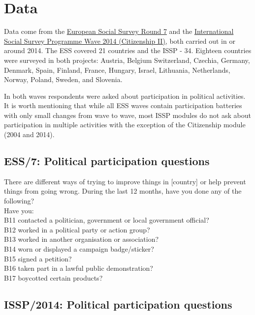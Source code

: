 \documentclass[12pt,]{article}
\begin{document}
\hypertarget{data}{%
\section{Data}\label{data}}

Data come from the \href{https://www.europeansocialsurvey.org/data/round-index.html}{European Social Survey Round 7} and the \href{https://www.gesis.org/issp/modules/issp-modules-by-topic/citizenship/2014/}{International Social Survey Programme Wave 2014 (Citizenship II)}, both carried out in or around 2014. The ESS covered 21 countries and the ISSP - 34. Eighteen countries were surveyed in both projects: Austria, Belgium Switzerland, Czechia, Germany, Denmark, Spain, Finland, France, Hungary, Israel, Lithuania, Netherlands, Norway, Poland, Sweden, and Slovenia.

In both waves respondents were asked about participation in political activities. It is worth mentioning that while all ESS waves contain participation batteries with only small changes from wave to wave, most ISSP modules do not ask about participation in multiple activities with the exception of the Citizenship module (2004 and 2014).

\hypertarget{ess7-political-participation-questions}{%
\subsection{ESS/7: Political participation questions}\label{ess7-political-participation-questions}}

There are different ways of trying to improve things in {[}country{]} or help prevent things from going wrong. During the last 12 months, have you done any of the following?\\
Have you:\\
B11 contacted a politician, government or local government official?\\
B12 worked in a political party or action group?\\
B13 worked in another organisation or association?\\
B14 worn or displayed a campaign badge/sticker?\\
B15 signed a petition?\\
B16 taken part in a lawful public demonstration?\\
B17 boycotted certain products?

\hypertarget{issp2014-political-participation-questions}{%
\subsection{ISSP/2014: Political participation questions}\label{issp2014-political-participation-questions}}
\end{document}
